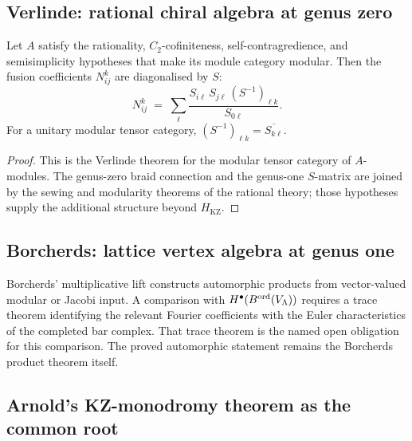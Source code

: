 \subsection{Verlinde: rational chiral algebra at genus zero}
\label{ssec:climax-platonic-cor-Verlinde}

\begin{corollary}
\label{cor:climax-verlinde-platonic}
\ClaimStatusProvedElsewhere
Let $A$ satisfy the rationality, $C_2$-cofiniteness, self-contragredience,
and semisimplicity hypotheses that make its module category modular.
Then the
fusion coefficients $N_{ij}^{k}$ are diagonalised by $S$:
\begin{equation}
\label{eq:climax-verlinde-platonic}
 N_{ij}^{k}
 \;=\; \sum_{\ell}
 \frac{S_{i\ell}\,S_{j\ell}\,(S^{-1})_{\ell k}}{S_{0\ell}}.
\end{equation}
For a unitary modular tensor category,
$(S^{-1})_{\ell k}=\overline{S_{k\ell}}$.
\end{corollary}

\begin{proof}
This is the Verlinde theorem for the modular tensor category of
$A$-modules.  The genus-zero braid connection and the genus-one
$S$-matrix are joined by the sewing and modularity theorems of the
rational theory; those hypotheses supply the additional structure
beyond $H_{\mathrm{KZ}}$.
\end{proof}

\subsection{Borcherds: lattice vertex algebra at genus one}
\label{ssec:climax-platonic-cor-Borcherds}

\begin{remark}
\label{cor:climax-borcherds-platonic}
\ClaimStatusOpen
Borcherds' multiplicative lift constructs automorphic products from
vector-valued modular or Jacobi input.  A comparison with
$H^\bullet(B^{\mathrm{ord}}(V_\Lambda))$ requires a trace theorem identifying
the relevant Fourier coefficients with the Euler characteristics of
the completed bar complex.  That trace theorem is the named open
obligation for this comparison.  The proved automorphic statement remains
the Borcherds product theorem itself.
\end{remark}

\subsection{Arnold's KZ-monodromy theorem as the common root}
\label{ssec:climax-platonic-cor-Arnold}

